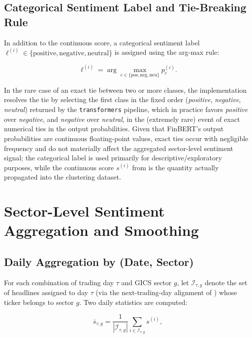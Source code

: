 \subsection{Categorical Sentiment Label and Tie-Breaking Rule}

In addition to the continuous score, a categorical sentiment label
$\ell^{(i)} \in \{\text{positive}, \text{negative}, \text{neutral}\}$ is
assigned using the arg-max rule:

\begin{equation}
  \label{eq:sentiment-label}
  \ell^{(i)} = \arg\max_{c \in \{\text{pos}, \text{neg}, \text{neu}\}}
  p_c^{(i)}.
\end{equation}

In the rare case of an exact tie between two or more classes, the
implementation resolves the tie by selecting the first class in the fixed
order (\emph{positive}, \emph{negative}, \emph{neutral}) returned by the
\texttt{transformers} pipeline, which in practice favors \emph{positive}
over \emph{negative}, and \emph{negative} over \emph{neutral}, in the
(extremely rare) event of exact numerical ties in the output
probabilities. Given that FinBERT's output probabilities are continuous
floating-point values, exact ties occur with negligible frequency and do
not materially affect the aggregated sector-level sentiment signal; the
categorical label is used primarily for descriptive/exploratory purposes,
while the continuous score $s^{(i)}$ from  is the
quantity actually propagated into the clustering dataset.

\section{Sector-Level Sentiment Aggregation and Smoothing}
\label{sec:meth-aggregation}

\subsection{Daily Aggregation by (Date, Sector)}

For each combination of trading day $\tau$ and GICS sector $g$, let
$\mathcal{I}_{\tau,g}$ denote the set of headlines assigned to day $\tau$
(via the next-trading-day alignment of ) whose
ticker belongs to sector $g$. Two daily statistics are computed:

\begin{equation}
  \label{eq:sector-mean}
  \overline{s}_{\tau,g} = \frac{1}{|\mathcal{I}_{\tau,g}|}
  \sum_{i \in \mathcal{I}_{\tau,g}} s^{(i)},
\end{equation}

